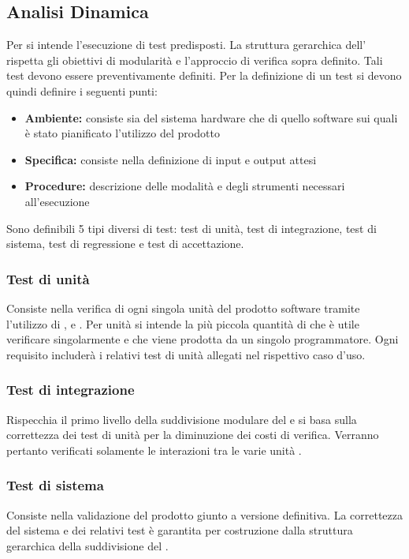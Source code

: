 \documentclass[12pt,a4paper]{article}
\begin{document}
\subsection{Analisi Dinamica} 
Per   si intende l'esecuzione di test predisposti. La struttura gerarchica dell'  rispetta gli obiettivi di modularità e l'approccio di verifica  sopra definito. Tali test devono essere preventivamente definiti. Per la definizione di un test si devono quindi definire i seguenti punti:
\begin{itemize}
	\item \textbf{Ambiente:} consiste sia del sistema hardware che di quello software sui quali è stato pianificato l'utilizzo del prodotto
	\item \textbf{Specifica:} consiste nella definizione di input e output attesi
	\item \textbf{Procedure:} descrizione delle modalità e degli strumenti necessari all'esecuzione
\end{itemize}
Sono definibili 5 tipi diversi di test: test di unità, test di integrazione, test di sistema, test di regressione e test di accettazione.

\subsubsection{Test di unità}
Consiste nella verifica di ogni singola unità del prodotto software tramite l'utilizzo di ,  e . Per unità si intende la più piccola quantità di  che è utile verificare singolarmente e che viene prodotta da un singolo programmatore. Ogni requisito includerà i relativi test di unità allegati nel rispettivo caso d'uso.

\subsubsection{Test di integrazione}
Rispecchia il primo livello della suddivisione modulare del  e si basa sulla correttezza dei test di unità per la diminuzione dei costi di verifica. Verranno pertanto verificati solamente le interazioni tra le varie unità .

\subsubsection{Test di sistema}
Consiste nella validazione del prodotto giunto a versione definitiva. La correttezza del sistema e dei relativi test è garantita per costruzione dalla struttura gerarchica della suddivisione del .
\end{document}

